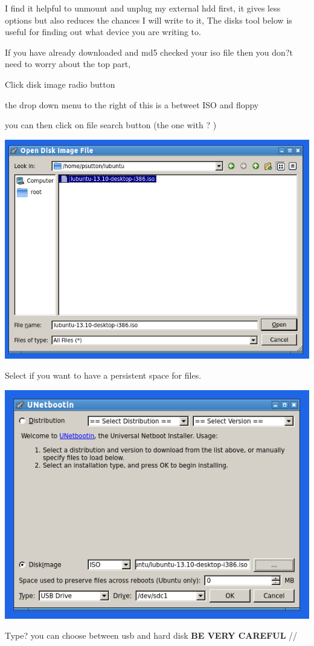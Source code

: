 \documentclass[12pt,a4paper]{book}
\begin{document}
I find it helpful to unmount and unplug my external hdd first,  it gives less options but also reduces the chances I will write to it,  The disks tool below is useful for finding out what device you are writing to.

If you have already downloaded and md5 checked your iso file then you don?t need to worry about the top part,

Click disk image radio button

the drop down menu to the right of this is a betweet ISO and floppy

you can then click on file search button (the one with ? )
\begin{center}
\includegraphics[width=0.7\linewidth]{unetbootin2} 

\end{center}



Select if you want to have a persistent space for files.


\begin{center}
\includegraphics[width=0.7\linewidth]{unetbootin3}
\end{center}

Type? you can choose between usb and hard disk \textbf{BE VERY CAREFUL} //
\end{document}
